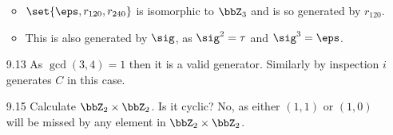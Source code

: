 \documentclass{article}
\begin{document}
\begin{enumerate}
\begin{itemize}
          \item $\set{\eps, r_{120}, r_{240}}$ is isomorphic to $\bbZ_{3}$ and is
                so generated by $r_{120}$.
          \item This is also generated by $\sig$, as $\sig^{2} = \tau$ and $\sig^{3} = \eps$.
        \end{itemize}
  \item[9.13\rparen] As $\gcd(3, 4) = 1$ then it is a valid generator.
        Similarly by inspection $i$ generates $C$ in this case.
  \item[9.15\rparen] Calculate $\bbZ_{2} \times \bbZ_{2}$. Is it cyclic?
        No, as either $(1, 1)$ or $(1, 0)$ will be missed by any element in $\bbZ_{2} \times \bbZ_{2}$.
\end{enumerate}
\end{document}
